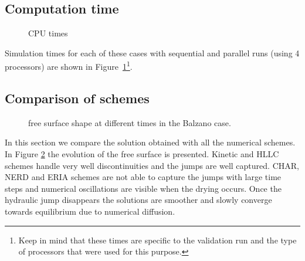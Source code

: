 \subsection{Computation time}

\begin{figure}[H]
  \centering
  \caption{CPU times}\label{fig:balzano:cputime}
\end{figure}

Simulation times for each of these cases with sequential and parallel runs (using 4 processors) are shown in Figure~\ref{fig:balzano:cputime}\footnote{Keep in mind that these times
are specific to the validation run and the type of processors that were used for this purpose.}.

\subsection{Comparison of schemes}

\begin{figure}[H]
\begin{minipage}[t]{0.5\textwidth}
 \centering
\end{minipage}%
\begin{minipage}[t]{0.5\textwidth}
 \centering
\end{minipage}
\begin{minipage}[t]{0.5\textwidth}
 \centering
\end{minipage}%
\begin{minipage}[t]{0.5\textwidth}
 \centering
\end{minipage}
\begin{minipage}[t]{0.5\textwidth}
 \centering
\end{minipage}%
\begin{minipage}[t]{0.5\textwidth}
 \centering
\end{minipage}
\caption{free surface shape at different times in the Balzano case.}
\label{fig:balzano:SL}
\end{figure}

In this section we compare the solution obtained with all the numerical schemes.
In Figure \ref{fig:balzano:SL} the evolution of the free surface is presented.
Kinetic and HLLC schemes handle very well discontinuities and the jumps are well captured.
CHAR, NERD and ERIA schemes are not able to capture the jumps with large time steps and numerical oscillations are visible when the drying occurs. Once the hydraulic jump disappears the solutions are smoother and slowly converge towards equilibrium due to numerical diffusion.

